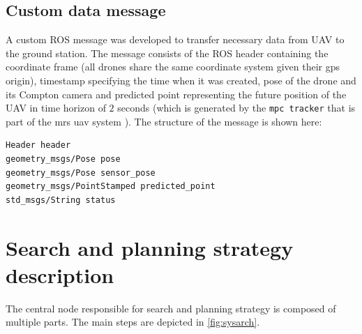 \subsection{Custom data message}
A custom \ac{ROS} message was developed to transfer necessary data from \ac{UAV} to the ground station.
The message consists of the \ac{ROS} header containing the coordinate frame (all drones share the same coordinate system given their gps origin),
timestamp specifying the time when it was created,
pose of the drone and its Compton camera 
and predicted point representing the future position of the \ac{UAV} in time horizon of $2$ seconds (which is generated by the \verb|mpc tracker| that is part of the mrs uav system \cite{mrs_system}).
The structure of the message is shown here:

\begin{lstlisting}[caption={DroneDataMsg.msg (caption)}, title={Custom message for data sharing between \ac{UAV} and central unit.}, label={code1}]
Header header
geometry_msgs/Pose pose
geometry_msgs/Pose sensor_pose
geometry_msgs/PointStamped predicted_point
std_msgs/String status
\end{lstlisting}


\section{Search and planning strategy description}
The central node responsible for search and planning strategy is composed of multiple parts.
The main steps are depicted in  \autoref{fig:sysarch}.

